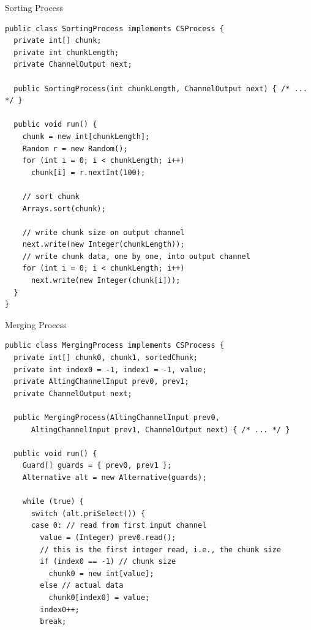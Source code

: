 \begin{frame}[fragile]{Sorting Process}
\begin{lstlisting}[basicstyle=\fontsize{7}{9}\selectfont\ttfamily]
public class SortingProcess implements CSProcess {
  private int[] chunk;
  private int chunkLength;
  private ChannelOutput next;

  public SortingProcess(int chunkLength, ChannelOutput next) { /* ... */ }

  public void run() {
    chunk = new int[chunkLength];
    Random r = new Random();
    for (int i = 0; i < chunkLength; i++)
      chunk[i] = r.nextInt(100);

    // sort chunk
    Arrays.sort(chunk);

    // write chunk size on output channel
    next.write(new Integer(chunkLength));
    // write chunk data, one by one, into output channel
    for (int i = 0; i < chunkLength; i++)
      next.write(new Integer(chunk[i]));
  }
}
\end{lstlisting}
\end{frame}

\begin{frame}[fragile]{Merging Process}
\begin{lstlisting}[basicstyle=\fontsize{7}{9}\selectfont\ttfamily]
public class MergingProcess implements CSProcess {
  private int[] chunk0, chunk1, sortedChunk;
  private int index0 = -1, index1 = -1, value;
  private AltingChannelInput prev0, prev1;
  private ChannelOutput next;

  public MergingProcess(AltingChannelInput prev0,
      AltingChannelInput prev1, ChannelOutput next) { /* ... */ }

  public void run() {
    Guard[] guards = { prev0, prev1 };
    Alternative alt = new Alternative(guards);

    while (true) {
      switch (alt.priSelect()) {
      case 0: // read from first input channel
        value = (Integer) prev0.read();
        // this is the first integer read, i.e., the chunk size
        if (index0 == -1) // chunk size
          chunk0 = new int[value];
        else // actual data
          chunk0[index0] = value;
        index0++;
        break;
\end{lstlisting}
\end{frame}

